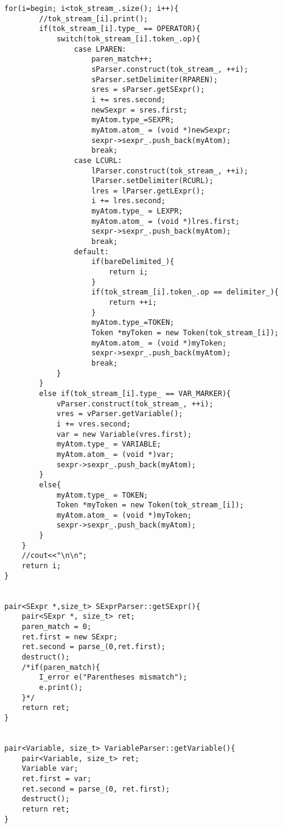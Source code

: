 \documentclass[pdftex,12pt,letterpaper,notitlepage,twoside]{article}
\begin{document}
\begin{lstlisting}[frame=single,caption={C program for testing}]
    for(i=begin; i<tok_stream_.size(); i++){
        //tok_stream_[i].print();
        if(tok_stream_[i].type_ == OPERATOR){
            switch(tok_stream_[i].token_.op){
                case LPAREN:    
                    paren_match++;
                    sParser.construct(tok_stream_, ++i);
                    sParser.setDelimiter(RPAREN);
                    sres = sParser.getSExpr();
                    i += sres.second;
                    newSexpr = sres.first;
                    myAtom.type_=SEXPR;
                    myAtom.atom_ = (void *)newSexpr;
                    sexpr->sexpr_.push_back(myAtom);
                    break;
                case LCURL:
                    lParser.construct(tok_stream_, ++i);
                    lParser.setDelimiter(RCURL);
                    lres = lParser.getLExpr();
                    i += lres.second;
                    myAtom.type_ = LEXPR;
                    myAtom.atom_ = (void *)lres.first;
                    sexpr->sexpr_.push_back(myAtom);
                    break;
                default:
                    if(bareDelimited_){
                        return i;
                    }
                    if(tok_stream_[i].token_.op == delimiter_){
                        return ++i;
                    }
                    myAtom.type_=TOKEN;
                    Token *myToken = new Token(tok_stream_[i]);
                    myAtom.atom_ = (void *)myToken;
                    sexpr->sexpr_.push_back(myAtom);
                    break;
            }
        }
        else if(tok_stream_[i].type_ == VAR_MARKER){
            vParser.construct(tok_stream_, ++i);
            vres = vParser.getVariable();
            i += vres.second;
            var = new Variable(vres.first);
            myAtom.type_ = VARIABLE;
            myAtom.atom_ = (void *)var;
            sexpr->sexpr_.push_back(myAtom);
        }
        else{
            myAtom.type_ = TOKEN;
            Token *myToken = new Token(tok_stream_[i]);
            myAtom.atom_ = (void *)myToken;
            sexpr->sexpr_.push_back(myAtom);
        }
    }
    //cout<<"\n\n";
    return i;
}


pair<SExpr *,size_t> SExprParser::getSExpr(){
    pair<SExpr *, size_t> ret;
    paren_match = 0;
    ret.first = new SExpr; 
    ret.second = parse_(0,ret.first);
    destruct();
    /*if(paren_match){
        I_error e("Parentheses mismatch");
        e.print();
    }*/
    return ret;
}


pair<Variable, size_t> VariableParser::getVariable(){
    pair<Variable, size_t> ret;
    Variable var;
    ret.first = var;
    ret.second = parse_(0, ret.first);
    destruct();
    return ret;
}


\end{lstlisting}
\end{document}
